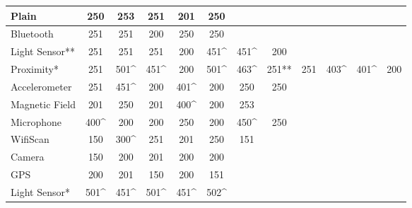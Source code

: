 \begin{table}[H]
	\centering
    \begin{tabular}{| l | c | c | c | c | c | c | c | c | c | c | c |}
    \hline
    Plain          & 250  & 253  & 251  & 201  & 250  & ~          & ~     & ~   & ~    & ~    & ~   \\\hline
    Bluetooth      & 251  & 251  & 200  & 250  & 250  & ~         & ~     & ~   & ~    & ~    & ~  \\\hline
    Light Sensor** & 251  & 251  & 251  & 200  & 451\^ & 451\^        & 200   & ~ & ~    & ~    & ~  \\ \hline
    Proximity*     & 251  & 501\^ & 451\^ & 200  & 501\^ & 463\^        & 251** & 251 & 403\^ & 401\^ & 200 \\ \hline
    Accelerometer  & 251  & 451\^ & 200  & 401\^ & 200  & 250          & 250   & ~ & ~    & ~    & ~  \\ \hline
    Magnetic Field & 201  & 250  & 201  & 400\^ & 200  & 253          & ~   & ~   & ~    & ~    & ~   \\ \hline
    Microphone     & 400\^ & 200  & 200  & 250  & 200  & 450\^        & 250   & ~ & ~    & ~    & ~   \\ \hline
    WifiScan       & 150  & 300\^ & 251  & 201  & 250  & 151   & ~ & ~    & ~    & ~   \\ \hline
    Camera         & 150  & 200  & 201  & 200  & 200  & ~          & ~     & ~   & ~    & ~    & ~   \\ \hline
    GPS            & 200  & 201  & 150  & 200  & 151  & ~          & ~     & ~   & ~    & ~    & ~   \\ \hline
    Light Sensor*  & 501\^ & 451\^ & 501\^ & 451\^ & 502\^ & ~          & ~     & ~   & ~    & ~    & ~  \\ \hline
    \end{tabular}
\end{table}